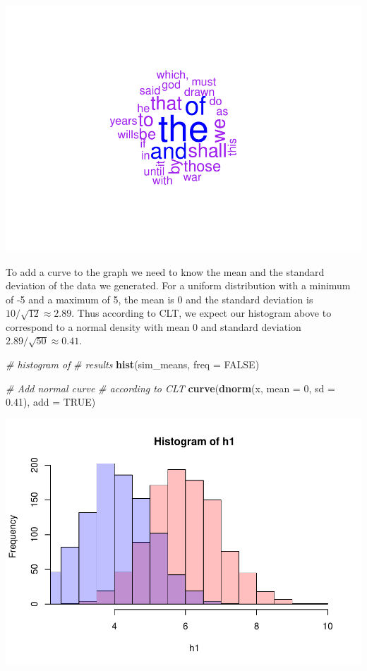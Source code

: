 \documentclass[
]{book}
\newenvironment{Shaded}{\begin{snugshade}}{\end{snugshade}}
\newcommand{\CommentTok}[1]{\textcolor[rgb]{0.56,0.35,0.01}{\textit{#1}}}
\newcommand{\DataTypeTok}[1]{\textcolor[rgb]{0.13,0.29,0.53}{#1}}
\newcommand{\DecValTok}[1]{\textcolor[rgb]{0.00,0.00,0.81}{#1}}
\newcommand{\FloatTok}[1]{\textcolor[rgb]{0.00,0.00,0.81}{#1}}
\newcommand{\KeywordTok}[1]{\textcolor[rgb]{0.13,0.29,0.53}{\textbf{#1}}}
\newcommand{\NormalTok}[1]{#1}
\newcommand{\OtherTok}[1]{\textcolor[rgb]{0.56,0.35,0.01}{#1}}
\begin{document}
\includegraphics{_main_files/figure-latex/unnamed-chunk-227-1.pdf}

To add a curve to the graph we need to know the mean and the standard deviation of the data we generated. For a uniform distribution with a minimum of -5 and a maximum of 5, the mean is 0 and the standard deviation is \(10/\sqrt{12} \approx 2.89\). Thus according to CLT, we expect our histogram above to correspond to a normal density with mean 0 and standard deviation \(2.89/\sqrt{50} \approx 0.41\).

\begin{Shaded}
\begin{Highlighting}[]
\CommentTok{# histogram of}
\CommentTok{# results}
\KeywordTok{hist}\NormalTok{(sim_means, }\DataTypeTok{freq =} \OtherTok{FALSE}\NormalTok{)}

\CommentTok{# Add normal curve}
\CommentTok{# according to CLT}
\KeywordTok{curve}\NormalTok{(}\KeywordTok{dnorm}\NormalTok{(x, }\DataTypeTok{mean =} \DecValTok{0}\NormalTok{,}
    \DataTypeTok{sd =} \FloatTok{0.41}\NormalTok{), }\DataTypeTok{add =} \OtherTok{TRUE}\NormalTok{)}
\end{Highlighting}
\end{Shaded}

\includegraphics{_main_files/figure-latex/unnamed-chunk-228-1.pdf}
\end{document}
